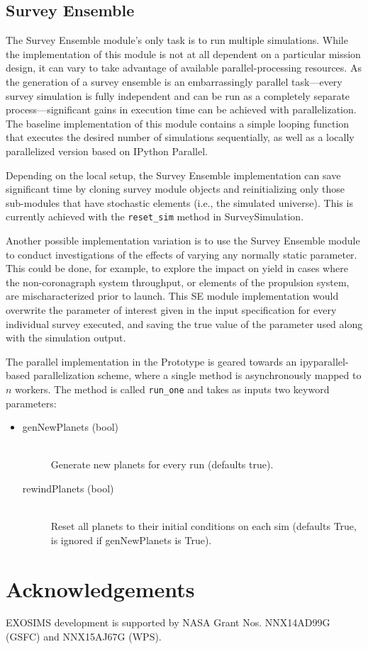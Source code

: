\documentclass[cleanfoot]{asme2ej}
\begin{document}

\subsection{Survey Ensemble}
The Survey Ensemble module's only task is to run multiple simulations.  While the implementation of this module is not at all dependent on a particular mission design, it can vary to take advantage of available parallel-processing resources.  As the generation of a survey ensemble is an embarrassingly parallel task---every survey simulation is fully independent and can be run as a completely separate process---significant gains in execution time can be achieved with parallelization.  The baseline implementation of this module contains a simple looping function that executes the desired number of simulations sequentially, as well as a locally parallelized version based on IPython Parallel.

Depending on the local setup, the Survey Ensemble implementation can save significant time by cloning survey module objects and reinitializing only those sub-modules that have stochastic elements (i.e., the simulated universe). This is currently achieved with the \verb+reset_sim+ method in SurveySimulation.

Another possible implementation variation is to use the Survey Ensemble module to conduct investigations of the effects of varying any normally static parameter.  This could be done, for example, to explore the impact on yield in cases where the non-coronagraph system throughput, or elements of the propulsion system, are mischaracterized prior to launch.  This SE module implementation would overwrite the parameter of interest given in the input specification for every individual survey executed, and saving the true value of the parameter used along with the simulation output.

The parallel implementation in the Prototype is geared towards an ipyparallel-based parallelization scheme, where a single method is asynchronously mapped to $n$ workers.  The method is called \verb+run_one+ and takes as inputs two keyword parameters:

\begin{itemize}
\item 
\begin{description}
    \item[genNewPlanets (bool)] \hfill \\ Generate new planets for every run (defaults true).
    \item[rewindPlanets (bool)] \hfill \\ Reset all planets to their initial conditions on each sim (defaults True, is ignored if genNewPlanets is True).
\end{description}
\end{itemize}

\section*{Acknowledgements}  EXOSIMS development is supported by NASA Grant Nos. NNX14AD99G (GSFC) and NNX15AJ67G (WPS).
\end{document}

